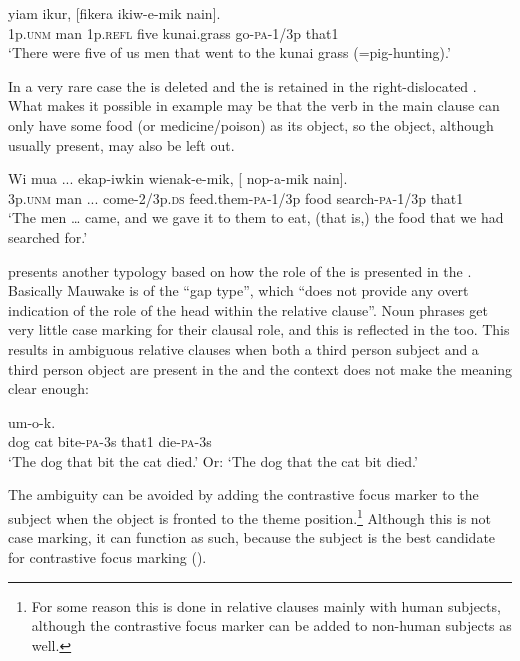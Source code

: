 \ea%
\label{ex:8:x1534}
\gll {}   yiam  ikur,  [fikera  ikiw-e-mik  nain]. \\
1p.\textsc{unm} man 1p.\textsc{refl} five kunai.grass go-\textsc{pa}-1/3p that1\\
\glt`There were five of us men that went to the kunai grass (=pig-hunting).'
\z


In a very rare case the  is deleted and the  is retained in the right-dislocated . What makes it possible in example  may be that the verb in the main clause can only have some food (or medicine/poison) as its object, so the object, although usually present, may also be left out.

\ea%
\label{ex:8:x1535}
\gll Wi  mua  ...  ekap-iwkin  wienak-e-mik, [  nop-a-mik  nain].\\
3p.\textsc{unm} man  ...  come-2/3p.\textsc{ds} feed.them-\textsc{pa}-1/3p food  search-\textsc{pa}-1/3p  that1\\
\glt`The men {\dots} came, and we gave it to them to eat, (that is,) the food that we had searched for.'
\z


\citet[144--146]{Comrie1981} presents another typology based on how the role of the  is presented in the . Basically Mauwake is of the ``gap type'', which ``does not provide any overt indication of the role of the head within the relative clause''. Noun phrases get very little case marking for their clausal role, and this is reflected in the  too. This results in ambiguous relative clauses when both a third person subject  and a third person object  are present in the  and the context does not make the meaning clear enough:

\ea%
\label{ex:8:x1548}
  um-o-k. \\
dog  cat  bite-\textsc{pa}-3s that1 die-\textsc{pa}-3s\\
\glt`The dog that bit the cat died.' Or: `The dog that the cat bit died.'
\z


The ambiguity can be avoided by adding the contrastive focus marker to the subject when the object is fronted to the theme position.\footnote{For some reason this is done in relative clauses mainly with human subjects, although the contrastive focus marker can be added to non-human subjects as well.}  Although this is not case marking, it can function as such, because the subject is the best candidate for contrastive focus marking ().

